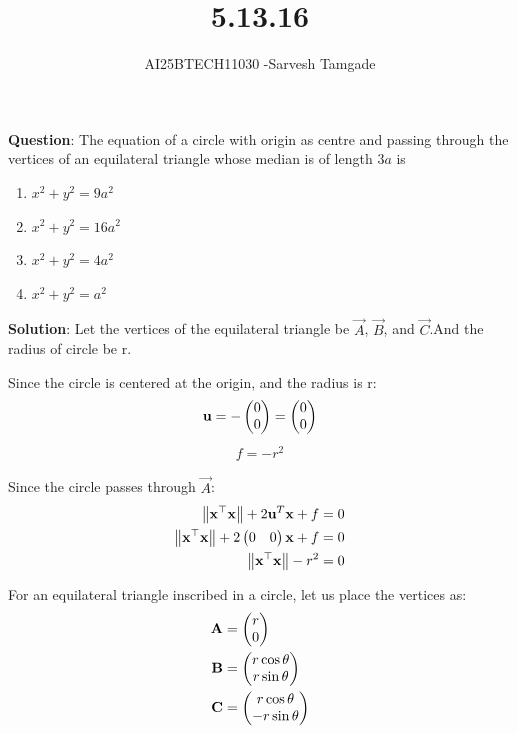 \documentclass[journal]{IEEEtran}
\begin{document}

\vspace{3cm}

\title{5.13.16}
\author{AI25BTECH11030 -Sarvesh Tamgade}
{\let\newpage\relax\maketitle}

\renewcommand{\thefigure}{\theenumi}
\renewcommand{\thetable}{\theenumi}
\setlength{\intextsep}{10pt} 


\renewcommand{\thetable}{\theenumi}


\textbf{Question}:
The equation of a circle with origin as centre and passing through the vertices of an equilateral triangle whose median is of length $3a$ is
\begin{enumerate}
\item $x^2 + y^2 = 9a^2$
\item $x^2 + y^2 = 16a^2$
\item $x^2 + y^2 = 4a^2$
\item $x^2 + y^2 = a^2$
\end{enumerate}


\textbf{Solution}:  
\solution
Let the vertices of the equilateral triangle be $\vec{A}$, $\vec{B}$, and $\vec{C}$.And the radius of circle be r.

Since the circle is centered at the origin, and the radius is r:
\begin{align}
\mathbf{u} = -\begin{pmatrix}0 \\ 0\end{pmatrix} = \begin{pmatrix}0 \\ 0\end{pmatrix}
\end{align}
\begin{align}
f=-r^2
\end{align}

Since the circle passes through $\vec{A}$:
\begin{align}
\left\lVert\mathbf{x}^\top\mathbf{x}\right\rVert + 2\mathbf{u}^T\mathbf{x} + f &= 0\\
\left\lVert\mathbf{x}^\top\mathbf{x}\right\rVert+ 2\begin{pmatrix}0 & 0\end{pmatrix}\mathbf{x} + f &= 0\\
\left\lVert\mathbf{x}^\top\mathbf{x}\right\rVert - r^2 &= 0\\
\end{align}

For an equilateral triangle inscribed in a circle, let us place the vertices as:
\begin{align}
\mathbf{A} &= \begin{pmatrix}r \\ 0\end{pmatrix}\\
\mathbf{B} &= \begin{pmatrix}r\cos\theta \\ r\sin\theta\end{pmatrix}\\
\mathbf{C} &= \begin{pmatrix}r\cos\theta \\ -r\sin\theta\end{pmatrix}
\end{align}
\end{document}
